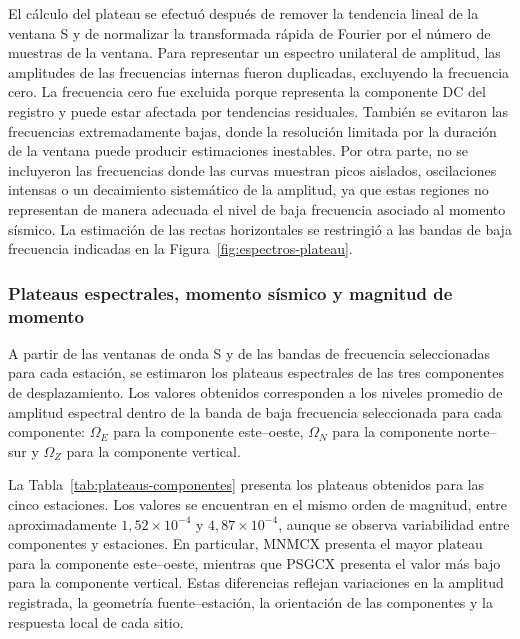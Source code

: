 \documentclass[a4paper,12pt]{article} %
\numberwithin{equation}{section} %
\numberwithin{figure}{section} %
\begin{document}
El cálculo del plateau se efectuó después de remover la tendencia lineal de la ventana S y de normalizar la transformada rápida de Fourier por el número de muestras de la ventana. Para representar un espectro unilateral de amplitud, las amplitudes de las frecuencias internas fueron duplicadas, excluyendo la frecuencia cero. La frecuencia cero fue excluida porque representa la componente DC del registro y puede estar afectada por tendencias residuales. También se evitaron las frecuencias extremadamente bajas, donde la resolución limitada por la duración de la ventana puede producir estimaciones inestables. Por otra parte, no se incluyeron las frecuencias donde las curvas muestran picos aislados, oscilaciones intensas o un decaimiento sistemático de la amplitud, ya que estas regiones no representan de manera adecuada el nivel de baja frecuencia asociado al momento sísmico. La estimación de las rectas horizontales se restringió a las bandas de baja frecuencia indicadas en la Figura~\ref{fig:espectros-plateau}.

\subsubsection{Plateaus espectrales, momento sísmico y magnitud de momento}

A partir de las ventanas de onda S y de las bandas de frecuencia seleccionadas para cada estación, se estimaron los plateaus espectrales de las tres componentes de desplazamiento. Los valores obtenidos corresponden a los niveles promedio de amplitud espectral dentro de la banda de baja frecuencia seleccionada para cada componente: \(\Omega_E\) para la componente este--oeste, \(\Omega_N\) para la componente norte--sur y \(\Omega_Z\) para la componente vertical.

La Tabla~\ref{tab:plateaus-componentes} presenta los plateaus obtenidos para las cinco estaciones. Los valores se encuentran en el mismo orden de magnitud, entre aproximadamente \(1{,}52\times10^{-4}\) y \(4{,}87\times10^{-4}\), aunque se observa variabilidad entre componentes y estaciones. En particular, MNMCX presenta el mayor plateau para la componente este--oeste, mientras que PSGCX presenta el valor más bajo para la componente vertical. Estas diferencias reflejan variaciones en la amplitud registrada, la geometría fuente--estación, la orientación de las componentes y la respuesta local de cada sitio.

\clearpage
\end{document}
